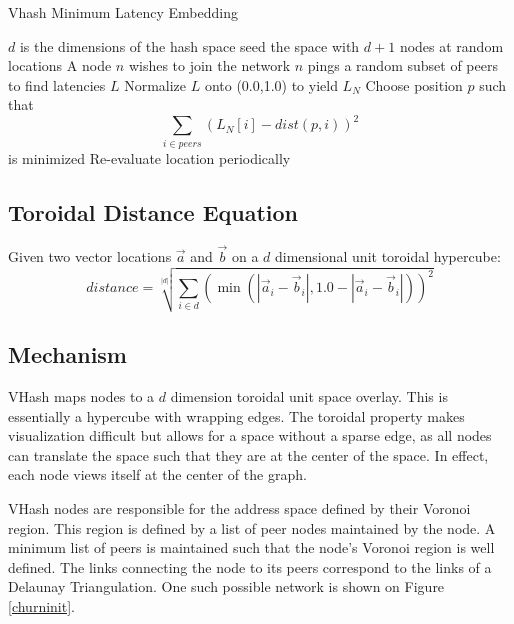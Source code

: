 \documentclass[11pt]{IEEEtran} %
\begin{document}
\begin{algorithm}
\caption{Vhash Minimum Latency Embedding}
\label{latency}
\begin{algorithmic}[1]  %
	\STATE $d$ is the dimensions of the hash space
    \STATE seed the space with $d+1$ nodes at random locations
   	\STATE A node $n$ wishes to join the network
    \STATE $n$ pings a random subset of peers to find latencies $L$
    \STATE Normalize $L$ onto (0.0,1.0) to yield $L_N$
    \STATE Choose position $p$ such that $$\sum\limits_{i\in peers}(L_N[i]-dist(p,i))^2$$ is minimized
    \STATE Re-evaluate location periodically
\end{algorithmic}
\end{algorithm}







\subsection{Toroidal Distance Equation}

Given two vector locations $\vec{a}$ and $\vec{b}$ on a  $d$ dimensional unit toroidal hypercube:
\[ distance = \sqrt[|d|]{\sum\limits_{i\in d} (\min(|\vec{a}_i-\vec{b}_i|,1.0-|\vec{a}_i-\vec{b}_i|))^2}\]

\subsection{Mechanism}
VHash maps nodes to a $d$ dimension toroidal unit space overlay. This is essentially a hypercube with wrapping edges. The toroidal property makes visualization difficult but allows for a space without a sparse edge, as all nodes can translate the space such that they are at the center of the space.  In effect, each node views itself at the center of the graph.

VHash nodes are responsible for the address space defined by their Voronoi region. This region is defined by a list of peer nodes maintained by the node. A minimum list of peers is maintained such that the node's Voronoi region is well defined. The links connecting the node to its peers correspond to the links of a Delaunay Triangulation.  One such possible network is shown on Figure \ref{churninit}.
\end{document}
